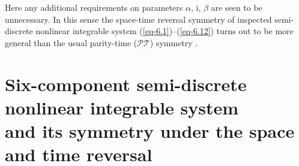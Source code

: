 \documentclass[10pt,a4paper]{amsart}
\providecommand{\cal}{\mathcal}
\numberwithin{equation}{section}
\begin{document}
Here any additional requirements on parameters $\alpha$, $\mathrm{i}$, $\beta$ are seen to be unnecessary. In this sense the space-time reversal symmetry of inspected semi-discrete nonlinear integrable system (\ref{eq-6.1})--(\ref{eq-6.12}) turns out to be more general than the usual parity-time ($\cal{PT}$) symmetry \cite{bender-RPP-70-947, konotop-RMP-88-035002}.


\section[Six-component semi-discrete nonlinear integrable system and its symmetry under the space and time reversal]{Six-component semi-discrete nonlinear integrable system \\
and its symmetry under the space and time reversal}
\label{sec7}
\end{document}
